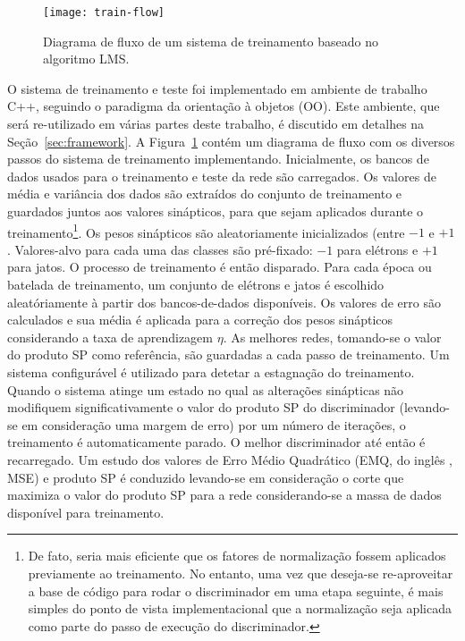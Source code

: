 \begin{figure}
\begin{center}
\texttt{[image: train-flow]}
\end{center}
\caption{Diagrama de fluxo de um sistema de treinamento baseado no algoritmo
LMS.}
\label{fig:train-flow}
\end{figure}

O sistema de treinamento e teste foi implementado em ambiente de trabalho C++,
seguindo o paradigma da orientação à objetos (OO). Este ambiente, que será
re-utilizado em várias partes deste trabalho, é discutido em detalhes na
Seção~\ref{sec:framework}. A Figura~\ref{fig:train-flow} contém um diagrama de
fluxo com os diversos passos do sistema de treinamento
implementando. Inicialmente, os bancos de dados usados para o treinamento e
teste da rede são carregados. Os valores de média e variância dos dados são
extraídos do conjunto de treinamento e guardados juntos aos valores
sinápticos, para que sejam aplicados durante o treinamento\footnote{De fato,
seria mais eficiente que os fatores de normalização fossem aplicados
previamente ao treinamento. No entanto, uma vez que deseja-se re-aproveitar a
base de código para rodar o discriminador em uma etapa seguinte, é mais
simples do ponto de vista implementacional que a normalização seja aplicada
como parte do passo de execução do discriminador.}. Os pesos sinápticos são
aleatoriamente inicializados (entre $-1$ e $+1$. Valores-alvo para cada uma
das classes são pré-fixado: $-1$ para elétrons e $+1$ para jatos. O processo
de treinamento é então disparado. Para cada época ou batelada de treinamento,
um conjunto de elétrons e jatos é escolhido aleatóriamente à partir dos
bancos-de-dados disponíveis. Os valores de erro são calculados e sua média é
aplicada para a correção dos pesos sinápticos considerando a taxa de
aprendizagem $\eta$. As melhores redes, tomando-se o valor do produto SP como
referência, são guardadas a cada passo de treinamento. Um sistema configurável
é utilizado para detetar a estagnação do treinamento. Quando o sistema atinge
um estado no qual as alterações sinápticas não modifiquem significativamente o
valor do produto SP do discriminador (levando-se em consideração uma margem de
erro) por um número de iterações, o treinamento é automaticamente parado. O
melhor discriminador até então é recarregado. Um estudo dos valores de Erro
Médio Quadrático (EMQ, do inglês , MSE) e produto SP é
conduzido levando-se em consideração o corte que maximiza o valor do produto
SP para a rede considerando-se a massa de dados disponível para treinamento.

